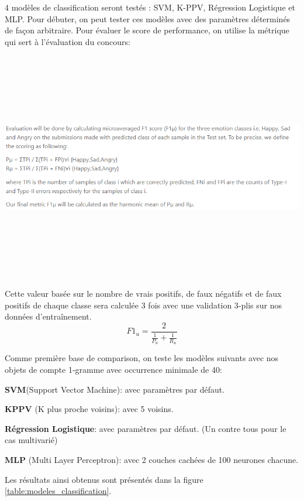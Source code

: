 4 modèles de classification seront testés : SVM, K-PPV, Régression Logistique et MLP. Pour débuter, on peut tester ces modèles avec des paramètres déterminés de façon arbitraire. Pour évaluer le score de performance, on utilise la métrique qui sert à l'évaluation du concours:

\includegraphics[width=\linewidth,height=10cm,keepaspectratio]{images/metric_concour}

Cette valeur basée sur le nombre de vrais positifs, de faux négatifs et de faux positifs de chaque classe sera calculée 3 fois avec une validation 3-plis sur nos données d'entraînement.
\begin{equation}
F1_{u} =\frac{2}{\frac{1}{P_{u}}+\frac{1}{R_{u}}}
\end{equation}

Comme première base de comparison, on teste les modèles suivants avec nos objets de compte 1-gramme avec occurrence minimale de 40:
\begin{description}
\item \textbf{SVM}(Support Vector Machine): avec paramètres par défaut.
\item \textbf{KPPV} (K plus proche voisins): avec 5 voisins.
\item \textbf{Régression Logistique}: avec paramètres par défaut. (Un contre tous pour le cas multivarié)
\item \textbf{MLP} (Multi Layer Perceptron): avec 2 couches cachées de 100 neurones chacune.
\end{description}

Les résultats ainsi obtenus sont présentés dans la figure \ref{table:modeles_classification}.

